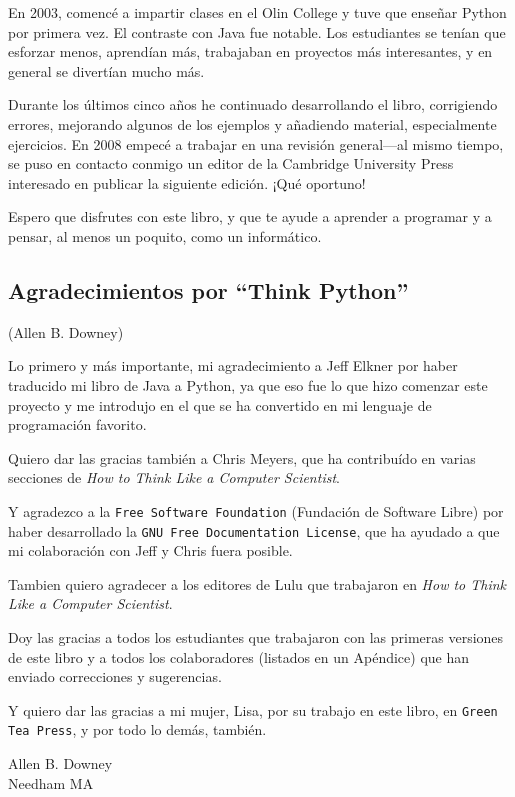 En 2003, comencé a impartir clases en el Olin College y tuve que enseñar
Python por primera vez. El contraste con Java fue notable.
Los estudiantes se tenían que esforzar menos, aprendían más, trabajaban
en proyectos más interesantes, y en general se divertían mucho más.

Durante los últimos cinco años he continuado desarrollando el libro,
corrigiendo errores, mejorando algunos de los ejemplos y
añadiendo material, especialmente ejercicios. En 2008 empecé a trabajar
en una revisión general---al mismo tiempo, se puso en contacto conmigo
un editor de la Cambridge University Press interesado en publicar la
siguiente edición. ¡Qué oportuno!

Espero que disfrutes con este libro, y que te ayude
a aprender a programar y a pensar, al menos un poquito, como
un informático.

\subsection*{Agradecimientos por ``Think Python''}

(Allen B. Downey)

Lo primero y más importante, mi agradecimiento a Jeff Elkner por
haber traducido mi libro de Java a Python, ya que eso fue lo que hizo
comenzar este proyecto y me introdujo en el que se ha convertido
en mi lenguaje de programación favorito.

Quiero dar las gracias también a Chris Meyers, que ha contribuído en varias
secciones de \emph{How to Think Like a Computer Scientist}.

Y agradezco a la {\tt Free Software Foundation} (Fundación de Software Libre) por
haber desarrollado la {\tt GNU Free Documentation License}, que ha ayudado
a que mi colaboración con Jeff y Chris fuera posible.


Tambien quiero agradecer a los editores de Lulu que trabajaron en
\emph{How to Think Like a Computer Scientist}.

Doy las gracias a todos los estudiantes que trabajaron con las
primeras versiones de este libro y a todos los colaboradores (listados
en un Apéndice) que han enviado correcciones y sugerencias.

Y quiero dar las gracias a mi mujer, Lisa, por su trabajo en este libro, en {\tt Green
Tea Press}, y por todo lo demás, también.

Allen B. Downey \\
Needham MA\\


